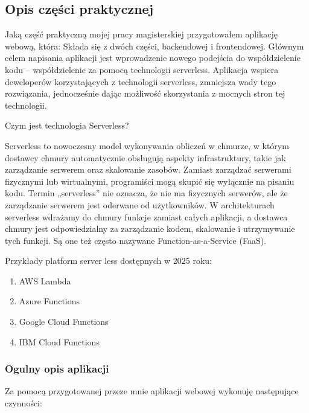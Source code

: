 \documentclass[runningheads,12pt]{llncs}
\begin{document}
\newpage



\subsection{Opis części praktycznej}

Jaką część praktyczną mojej pracy magisterskiej przygotowałem aplikację webową, która:
Składa się z dwóch części, backendowej i frontendowej.
Głównym celem napisania aplikacji jest wprowadzenie nowego podejścia do współdzielenie kodu – współdzielenie za pomocą technologii serverless. Aplikacja wspiera deweloperów korzystających z technologii serverless, zmniejsza wady tego rozwiązania, jednocześnie dając możliwość skorzystania z mocnych stron tej technologii.

Czym jest technologia Serverless?

Serverless to nowoczesny model wykonywania obliczeń w chmurze, w którym dostawcy chmury automatycznie obsługują aspekty infrastruktury, takie jak zarządzanie serwerem oraz skalowanie zasobów. Zamiast zarządzać serwerami fizycznymi lub wirtualnymi, programiści mogą skupić się wyłącznie na pisaniu kodu. Termin „serverless” nie oznacza, że nie ma fizycznych serwerów, ale że zarządzanie serwerem jest oderwane od użytkowników. W architekturach serverless wdrażamy do chmury funkcje zamiast całych aplikacji, a dostawca chmury jest odpowiedzialny za zarządzanie kodem, skalowanie i utrzymywanie tych funkcji. Są one też często nazywane Function-as-a-Service (FaaS).

Przykłady platform server less dostępnych w 2025 roku:

\begin{enumerate}
    \item AWS Lambda 
    \item Azure Functions 
    \item Google Cloud Functions 
    \item IBM Cloud Functions 
\end{enumerate}

\subsubsection{Ogulny opis aplikacji}

Za pomocą przygotowanej przeze mnie aplikacji webowej wykonuję następujące czynności:
\end{document}
